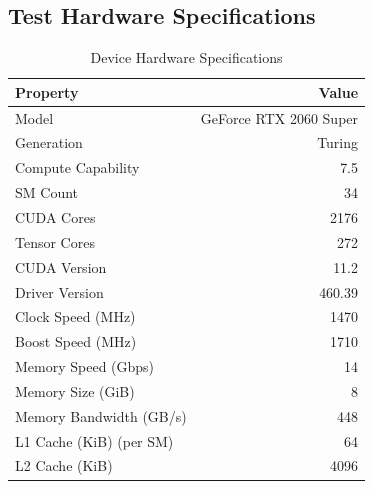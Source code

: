 \documentclass[12pt, letterpaper]{article}
\begin{document}
\subsection{Test Hardware Specifications}
\FloatBarrier
\begin{table}[htbp]
  \centering
  \caption{Device Hardware Specifications}
  \label{specs}
  \begin{tabular}{lr}
      \toprule
          Property                & Value                           \\
          \midrule
          Model                   & GeForce RTX 2060 Super          \\
          Generation              & Turing                          \\
          Compute Capability      & 7.5                             \\
          SM Count                & 34                              \\
          CUDA Cores              & 2176                            \\
          Tensor Cores            & 272                             \\
          CUDA Version            & 11.2                            \\
          Driver Version          & 460.39                          \\
          Clock Speed (MHz)       & 1470                            \\
          Boost Speed (MHz)       & 1710                            \\
          Memory Speed (Gbps)     & 14                              \\
          Memory Size (GiB)       & 8                               \\
          Memory Bandwidth (GB/s) & 448                             \\
          L1 Cache (KiB) (per SM) & 64                              \\
          L2 Cache (KiB)          & 4096                            \\
          \bottomrule
  \end{tabular}
\end{table}
\end{document}
